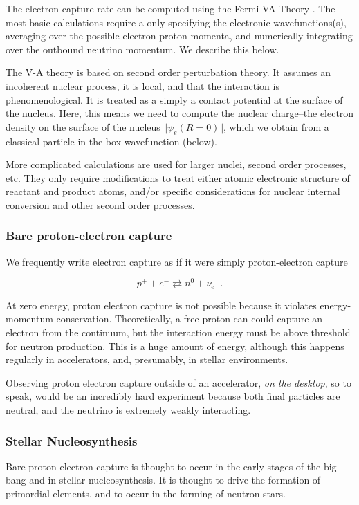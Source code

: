 \documentclass[%
 aip,
 jmp,%
 amsmath,amssymb,
 reprint,%
]{revtex4-1}
\begin{document}
The electron capture rate can be computed using the Fermi VA-Theory \cite{ec-review1,ec-review2}.  The most basic calculations require a only specifying the electronic wavefunctions(s), averaging over the possible electron-proton momenta, and numerically integrating over the outbound neutrino momentum.  We describe this below.

The V-A theory is based on second order perturbation theory.  It assumes an incoherent nuclear process, it is local, and that the interaction is phenomenological. It is treated as a simply a contact potential at the surface of the nucleus. Here, this means we need to compute the nuclear charge--the electron density on the surface of the nucleus $\Vert\psi_{e}(R=0)\Vert$, which we obtain from a classical particle-in-the-box wavefunction (below).

More complicated calculations are used for larger nuclei, second order processes, etc.  They only require modifications to treat either atomic electronic structure of reactant and product atoms, and/or specific considerations for nuclear internal conversion and other second order processes.

\subsubsection{Bare proton-electron capture}

We frequently write electron capture as if it were simply proton-electron capture

$$p^{+}+e^{-} \rightleftarrows n^{0}+\nu_{e}\;\;.$$

At zero energy, proton electron capture is not possible because it violates energy-momentum conservation. Theoretically, a free proton can could capture an electron from the continuum, but the interaction energy must be  above threshold for neutron production.  This is a huge amount of energy, although this happens regularly in accelerators, and, presumably, in stellar environments.

Observing proton electron capture outside of an accelerator, \emph{on the desktop}, so to speak, would be an incredibly hard experiment because both final particles are neutral, and  the neutrino is extremely weakly interacting.


\subsubsection{Stellar Nucleosynthesis}

Bare proton-electron capture is thought to occur  in the early stages of the big bang and in stellar nucleosynthesis.  It is thought to drive the formation of primordial elements, and to occur in the forming of neutron stars.   
\end{document}
